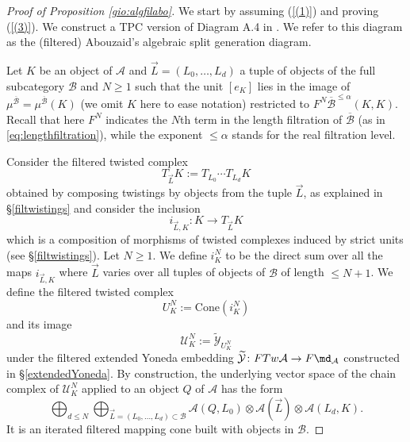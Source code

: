 	\begin{proof}[Proof of Proposition \ref{gio:algfilabo}]
		
		We start by assuming (\ref{(1)}) and proving (\ref{(3)}). We construct a TPC version of Diagram A.4 in \cite[Appendix A]{Ab:geom-crit}. We refer to this diagram as the (filtered) Abouzaid's algebraic split generation diagram. 
		
		Let $K$ be an object of $\mathcal{A}$ and $\vec{L}=(L_0,\ldots, L_d)$ a tuple of objects of the full subcategory $\mathcal{B}$ and $N\geq 1$ such that the unit $[e_K]$ lies in the image of $\mu^{\overline{\mathcal{B}}} =\mu^{\overline{\mathcal{B}}}(K)$ (we omit $K$ here to ease notation) restricted to $F^N\overline{\mathcal{B}}^{\leq \alpha}(K,K)$. Recall that here $F^N$  indicates the $N$th term in the length filtration of $\overline{\mathcal{B}}$ (as in \ref{eq:lengthfiltration}), while the exponent $\leq \alpha$ stands for the real filtration level.
		
		
		
		Consider the filtered twisted complex $$T_{\vec{L}}K:= T_{L_0}\cdots T_{L_d}K$$ obtained by composing twistings by objects from the tuple $\vec{L}$, as explained in \S\ref{filtwistings} and consider the inclusion $$i_{\vec{L},K}\colon K\to T_{\vec{L}}K$$ which is a composition of morphisms of twisted complexes induced by strict units (see \S\ref{filtwistings}). Let $N\geq 1$. We define $i^N_K$ to be the direct sum over all the maps $i_{\vec{L},K}$ where $\vec{L}$ varies over all tuples of objects of $\mathcal{B}$ of length $\leq N+1$.
		We define the filtered twisted complex $$U^N_K:=\text{Cone}(i^N_K)$$ and its image $$\mathcal{U}^N_K:=\widetilde{\mathcal{Y}}_{U^N_K}$$ under the filtered extended Yoneda embedding $\widetilde{\mathcal{Y}}\colon FTw\mathcal{A}\to F\md_\mathcal{A}$ constructed in \S\ref{extendedYoneda}. By construction, the underlying vector space of the chain complex of $\mathcal{U}^N_K$ applied to an object $Q$ of $\mathcal{A}$ has the form
		$$\bigoplus_{d\leq N}\bigoplus_{\vec{L}=(L_0,\ldots, L_d)\subset \mathcal{B}} \mathcal{A}(Q,L_0)\otimes \mathcal{A}(\vec{L})\otimes \mathcal{A}(L_d,K).$$
		It is an iterated filtered mapping cone built with objects in $\mathcal{B}$.
		

\end{proof}

